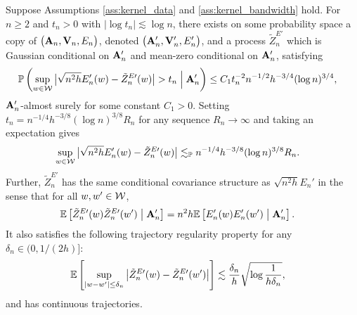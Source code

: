 \begin{lemma}
  \label{lem:kernel_app_conditional_strong_approx_En}

  Suppose Assumptions
  \ref{ass:kernel_data} and \ref{ass:kernel_bandwidth} hold.
  For $n \geq 2$
  and $t_n > 0$ with $\left|\log t_n\right| \lesssim \log n$,
  there exists on some probability space
  a copy of
  $\big(\mathbf{A}_n, \mathbf{V}_n, E_n\big)$,
  denoted
  $\big(\mathbf{A}_n', \mathbf{V}_n', E_n'\big)$,
  and a process
  $\tilde Z^{E\prime}_n$
  which is Gaussian conditional on $\mathbf{A}_n'$
  and mean-zero conditional on $\mathbf{A}_n'$,
  satisfying
  \begin{align*}
    \mathbb{P}\left(
      \sup_{w \in \mathcal{W}}
      \big|
      \sqrt{n^2h} E_n'(w) - \tilde Z_n^{E\prime}(w)
      \big|
      > t_n
      \Bigm\vert \mathbf{A}_n'
    \right)
    &\leq
    C_1
    t_n^{-2}
    n^{-1/2}
    h^{-3/4}
    (\log n)^{3/4},
  \end{align*}
  $\mathbf{A}_n'$-almost surely
  for some constant $C_1 > 0$.
  Setting $t_n = n^{-1/4} h^{-3/8} (\log n)^{3/8} R_n$
  for any sequence $R_n \to \infty$
  and taking an expectation gives
  \begin{align*}
    \sup_{w \in \mathcal{W}}
    \big|
    \sqrt{n^2h} E_n'(w) - \tilde Z_n^{E\prime}(w)
    \big|
    &\lesssim_{\mathbb{P}}
    n^{-1/4}
    h^{-3/8} (\log n)^{3/8} R_n.
  \end{align*}
  Further,
  $\tilde Z_n^{E\prime}$ has the same
  conditional covariance structure as
  $\sqrt{n^2h} E_n'$ in the sense that for all $w, w' \in \mathcal{W}$,
  \begin{align*}
    \mathbb{E}\left[
      \tilde Z_n^{E\prime}(w)
      \tilde Z_n^{E\prime}(w')
      \bigm\vert \mathbf{A}_n'
    \right]
    &=
    n^2h
    \mathbb{E}\left[
      E_n'(w)
      E_n'(w')
      \bigm\vert \mathbf{A}_n'
    \right].
  \end{align*}
  It also satisfies the following
  trajectory regularity property
  for any $\delta_n \in (0, 1/(2h)]$:
  \begin{align*}
    \mathbb{E}\left[
      \sup_{|w-w'| \leq \delta_n}
      \big|
      \tilde Z_n^{E\prime}(w)
      - \tilde Z_n^{E\prime}(w')
      \big|
    \right]
    &\lesssim
    \frac{\delta_n}{h}
    \sqrt{\log \frac{1}{h\delta_n}},
  \end{align*}
  and has continuous trajectories.

\end{lemma}

